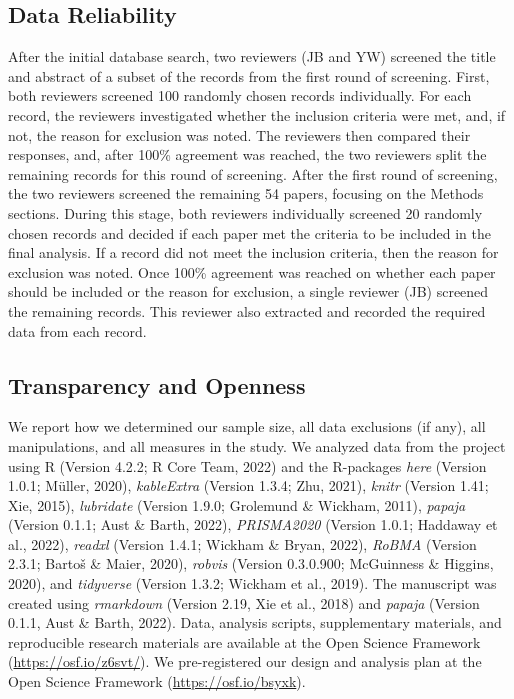 \documentclass[
  ,pub,floatsintext]{apa6}
\begin{document}
\hypertarget{data-reliability}{%
\subsection{Data Reliability}\label{data-reliability}}

After the initial database search, two reviewers (JB and YW) screened the title and abstract of a subset of the records from the first round of screening. First, both reviewers screened 100 randomly chosen records individually. For each record, the reviewers investigated whether the inclusion criteria were met, and, if not, the reason for exclusion was noted. The reviewers then compared their responses, and, after 100\% agreement was reached, the two reviewers split the remaining records for this round of screening. After the first round of screening, the two reviewers screened the remaining 54 papers, focusing on the Methods sections. During this stage, both reviewers individually screened 20 randomly chosen records and decided if each paper met the criteria to be included in the final analysis. If a record did not meet the inclusion criteria, then the reason for exclusion was noted. Once 100\% agreement was reached on whether each paper should be included or the reason for exclusion, a single reviewer (JB) screened the remaining records. This reviewer also extracted and recorded the required data from each record.

\hypertarget{transparency-and-openness}{%
\subsection{Transparency and Openness}\label{transparency-and-openness}}

We report how we determined our sample size, all data exclusions (if any), all manipulations, and all measures in the study. We analyzed data from the project using R (Version 4.2.2; R Core Team, 2022) and the R-packages \emph{here} (Version 1.0.1; Müller, 2020), \emph{kableExtra} (Version 1.3.4; Zhu, 2021), \emph{knitr} (Version 1.41; Xie, 2015), \emph{lubridate} (Version 1.9.0; Grolemund \& Wickham, 2011), \emph{papaja} (Version 0.1.1; Aust \& Barth, 2022), \emph{PRISMA2020} (Version 1.0.1; Haddaway et al., 2022), \emph{readxl} (Version 1.4.1; Wickham \& Bryan, 2022), \emph{RoBMA} (Version 2.3.1; Bartoš \& Maier, 2020), \emph{robvis} (Version 0.3.0.900; McGuinness \& Higgins, 2020), and \emph{tidyverse} (Version 1.3.2; Wickham et al., 2019). The manuscript was created using \emph{rmarkdown} (Version 2.19, Xie et al., 2018) and \emph{papaja} (Version 0.1.1, Aust \& Barth, 2022). Data, analysis scripts, supplementary materials, and reproducible research materials are available at the Open Science Framework (\url{https://osf.io/z6svt/}). We pre-registered our design and analysis plan at the Open Science Framework (\url{https://osf.io/bsyxk}).
\end{document}
